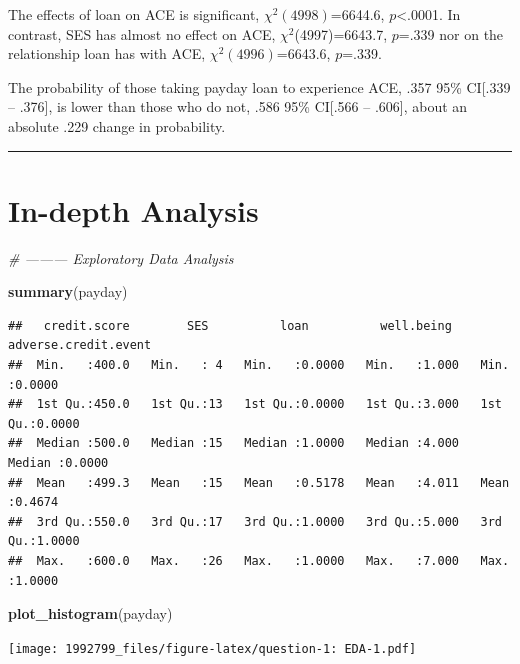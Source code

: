 \documentclass[]{article}
\newenvironment{Shaded}{\begin{snugshade}}{\end{snugshade}}
\newcommand{\CommentTok}[1]{\textcolor[rgb]{0.56,0.35,0.01}{\textit{#1}}}
\newcommand{\KeywordTok}[1]{\textcolor[rgb]{0.13,0.29,0.53}{\textbf{#1}}}
\newcommand{\NormalTok}[1]{#1}
\begin{document}
The effects of loan on ACE is significant, \(\chi^2(4998)\)=6644.6,
\(p\)\textless{}.0001. In contrast, SES has almost no effect on ACE,
\(\chi^2\)(4997)=6643.7, \(p\)=.339 nor on the relationship loan has
with ACE, \(\chi^2(4996)\)=6643.6, \(p\)=.339.

The probability of those taking payday loan to experience ACE, .357 95\%
CI{[}.339 -- .376{]}, is lower than those who do not, .586 95\%
CI{[}.566 -- .606{]}, about an absolute .229 change in probability.

\begin{center}\rule{0.5\linewidth}{\linethickness}\end{center}

\hypertarget{in-depth-analysis}{%
\section{In-depth Analysis}\label{in-depth-analysis}}

\begin{Shaded}
\begin{Highlighting}[]
\CommentTok{# --------- Exploratory Data Analysis}

\KeywordTok{summary}\NormalTok{(payday)}
\end{Highlighting}
\end{Shaded}

\begin{verbatim}
##   credit.score        SES          loan          well.being    adverse.credit.event
##  Min.   :400.0   Min.   : 4   Min.   :0.0000   Min.   :1.000   Min.   :0.0000      
##  1st Qu.:450.0   1st Qu.:13   1st Qu.:0.0000   1st Qu.:3.000   1st Qu.:0.0000      
##  Median :500.0   Median :15   Median :1.0000   Median :4.000   Median :0.0000      
##  Mean   :499.3   Mean   :15   Mean   :0.5178   Mean   :4.011   Mean   :0.4674      
##  3rd Qu.:550.0   3rd Qu.:17   3rd Qu.:1.0000   3rd Qu.:5.000   3rd Qu.:1.0000      
##  Max.   :600.0   Max.   :26   Max.   :1.0000   Max.   :7.000   Max.   :1.0000
\end{verbatim}

\begin{Shaded}
\begin{Highlighting}[]
\KeywordTok{plot_histogram}\NormalTok{(payday)}
\end{Highlighting}
\end{Shaded}

\texttt{[image: 1992799\_files/figure-latex/question-1: EDA-1.pdf]}
\end{document}
